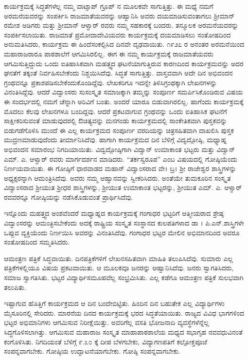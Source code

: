 {ಕಾರ್ಯಕ್ರಮಕ್ಕೆ ಸಿದ್ಧತೆಗಳೆಲ್ಲ ನಮ್ಮ ವಾಟ್ಸಾಪ್ ಗ್ರೂಪ್ ನ ಮೂಲಕವೇ ಸಾಗುತ್ತಿತ್ತು. ಈ ಮಧ್ಯೆ ನಮಗೆ ಅರಮನೆಯವರನ್ನು ಸಂಪರ್ಕಿಸಿ ರಾಜಮಾತೆಯವರನ್ನು ಆಹ್ವಾನಿಸಿ ಅವರು ದಯಮಾಡಿಸುವಂತಾಗಲು ಶ್ರೀಮಾನ್ ರಮೇಶ ಅಡಿಗರು ಮತ್ತು ಶ್ರೀಮಾನ್ ಆಳ್ವಾರ್ ರವರು ನಮ್ಮ ಸಹಕಾರಕ್ಕೆ ಬಂದರು. ತನ್ಮೂಲಕ ಅರಮನೆಯವರನ್ನು ಸಂಪರ್ಕಿಸಲಾಯಿತು. ರಾಜಮಾತೆ ಪ್ರಮೋದಾದೇವಿಯವರು ಕಾರ್ಯಕ್ರಮಕ್ಕೆ ದಯಮಾಡಿಸಲು ಸಂತೋಷದಿಂದ ಅನುಮತಿಸಿದರು, ಕಾರ್ಯಕ್ರಮ ಈ ಹಿಂದೆ\break ಸಂಕಲ್ಪಿಸಿದ ದಿನವೇ ದೃಢವಾಯಿತು. ೧೯೨೭ ರ ಅನಂತರ ಅರಮನೆಯಿಂದ ಮಹಾರಾಜರಾರೂ ಪಾಠಶಾಲೆಗೆ ಆಗಮಿಸಿರಲಿಲ್ಲ. ಈಗ ಈ ನಮ್ಮ ಕಾರ್ಯಕ್ರಮಕ್ಕೆ ರಾಜಮಾತೆಯವರು ಆಗಮಿಸುತ್ತಿದ್ದುದು ಒಂದು ಐತಿಹಾಸಿಕವಾಗಿ ಮಹತ್ತ್ವದ ಘಟನೆ\-ಯಾಗುತ್ತಿರುವ ಕಾರಣದಿಂದ ಕಾರ್ಯಕ್ರಮವನ್ನು ಅದರ ಘನತೆಗೆ ತಕ್ಕಂತೆ ನಿರ್ವಹಿಸಬೇಕೆಂದು ನಿಶ್ಚಯಿಸಿದೆವು. ಸಿದ್ಧತೆ ಸಾಗುತ್ತಿತ್ತು. ವಾಸ್ತವವಾಗಿ ಅದೇ ದಿನ ಅಭಿವಂದನ ಗ್ರಂಥವನ್ನೂ ಪ್ರಕಾಶಪಡಿಸಬೇಕೆಂದುಕೊಂಡಿದ್ದೆವು. ಲೇಖಕರಿಗೂ ಇದನ್ನೇ ತಿಳಿಸಿ\break ಗ್ರಂಥಕ್ಕಾಗಿ ಲೇಖನಗಳನ್ನು ವಿನಂತಿಸಿದ್ದೆವು. ಆದರೆ ವಿದ್ವಾಂಸರು ಸುಸಂಸ್ಕೃತ ಸಮಾಜ\-ಕ್ಕಾಗಿ ತಮ್ಮನ್ನು ಸಂಪೂರ್ಣ ಸಮರ್ಪಿಸಿಕೊಂಡಿರುವ ವಿಷಯ ಈ ಸಂದರ್ಭದಲ್ಲಿ ನಮಗೆ ಚೆನ್ನಾಗಿ ಅರಿವಿಗೆ ಬಂತು. ಅಂದರೆ ಯಾರೂ ಬಿಡುವಾಗಿರಲಿಲ್ಲ. ಹಾಗೆಂದು ಕಾರ್ಯಕ್ರಮಕ್ಕೆ ಮೊದಲು ಕೆಲವು ಲೇಖನಗಳೂ ಬಂದಿದ್ದವು. ಆದರೆ ಪ್ರಕಟವಾಗುವ ಗ್ರಂಥವನ್ನು ಒಂದು ಐತಿಹಾಸಿಕ ಘಟನೆಗೆ ಸಾಕ್ಷೀಕರಿಸುವಂತೆ ಮಾಡುವುದರಲ್ಲಿ  ಔಚಿತ್ಯವನ್ನು ಮನಗಂಡು ಕಾರ್ಯಕ್ರಮದಲ್ಲಿ ಸಾಂಕೇತಿಕವಾಗಿ ಪುಸ್ತಕವನ್ನು ಬಿಡುಗಡೆಗೊಳಿಸಿ ಮುಂದೆ ಈ ಎಲ್ಲ ಕಾರ್ಯಕ್ರಮದ ಸಂಪೂರ್ಣ ವರದಿಯನ್ನು ಚಿತ್ರಸಹಿತವಾಗಿ ದಾಖಲಿಸಿ ಪುಸ್ತಕ ಮುದ್ರಣಮಾಡುವುದೆಂದು ತೀರ್ಮಾನಿಸಿದೆವು. ಹಾಗಾಗಿ ಕಾರ್ಯಕ್ರಮದ ದಿನ ಬೆಳಿಗ್ಗೆ ವಿದ್ವದ್ಗೋಷ್ಠಿ, ಮಧ್ಯಾಹ್ನ ಅಭಿವಂದನ ಸಮಾರಂಭ ನಿಗದಿಯಾಯಿತು. ವಿದ್ವದ್ಗೋಷ್ಠಿಗಾಗಿ ವಿದ್ವಾನ್ ಉಮಾಕಾಂತ ಭಟ್ಟರು ಮತ್ತು ವಿದ್ವಾನ್ ಎಮ್. ಎ. ಆಳ್ವಾರ್ ರವರು ಮಾರ್ಗದರ್ಶನ ಮಾಡಿದರು. “ತರ್ಕಸ್ವರೂಪ” ಎಂಬ ವಿಷಯದಲ್ಲಿ ಗೋಷ್ಠಿಯೆಂದು ನಿರ್ಣಯವಾಯಿತು. ಈ ಗೋಷ್ಠಿಗೆ ಧಾರವಾಡದ ಮಹಾನ್ ವಿದ್ವಾಂಸರಾದ ವೇ। ಬ್ರ। ಶ್ರೀ ರಾಜೇಶ್ವರ ಶಾಸ್ತ್ರಿಗಳನ್ನು ಅಧ್ಯಕ್ಷರನ್ನಾಗಿ ಆಮಂತ್ರಿಸಿದೆವು. ಅವರು ನಮ್ಮ ಆಹ್ವಾನವನ್ನು ಸ್ವೀಕರಿಸಿದರು. ಅಂತೆಯೇ ತುಮಕೂರಿನ ಸಂಸ್ಕೃತ ವಿದ್ವಾಂಸರಾದ ಶ್ರೀಯುತ ಶ್ರೀಧರ ಶಾಸ್ತ್ರಿಗಳನ್ನು,  ಶ್ರೀಯುತ ಉಮಾಕಾಂತ ಭಟ್ಟರನ್ನು, ಶ್ರೀಯುತ ಎಮ್. ಎ. ಆಳ್ವಾರ್ ರವವರನ್ನೂ ಗೋಷ್ಠಿಯನ್ನು ನಡೆಸಿಕೊಡುವಂತೆ ಪ್ರಾರ್ಥಿಸಿದೆವು. 
\vskip 8pt

ಇನ್ನೊಂದು ಮಹತ್ತ್ವದ ಅಂಶವೆಂದರೆ ಮಧ್ಯಾಹ್ನದ ಕಾರ್ಯಕ್ರಮಕ್ಕೆ ಗಂಗಾಧರ ಭಟ್ಟರಿಗೆ ಆತ್ಮೀಯರಾದ ಶ್ರೇಷ್ಠ ವಿದ್ವಾಂಸರನ್ನು ಆಮಂತ್ರಿಸಬೇಕೆಂದು ಅದಕ್ಕೆ ರಾಷ್ಟ್ರಿಯ ಸಂಸ್ಕೃತ ಸಂಸ್ಥಾನದ ಕುಲಪತಿಗಳಾದ ಡಾ । ಪಿ.ಎನ್.ಶಾಸ್ತ್ರಿಗಳೇ ಒಪ್ಪುವ ವ್ಯಕ್ತಿಯೆಂದು ನಿರ್ಣಯಿಸಿ ಅವರನ್ನು ವಿನಂತಿಸಿದೆವು. ಗಂಗಾಧರ ಭಟ್ಟರ ಮೇಲಿನ ಅಭಿಮಾನದಿಂದ ಅವರೂ ಸಂತೋಷದಿಂದ ಸಮ್ಮತಿಸಿದರು. 

ಆಮಂತ್ರಣ ಪತ್ರಿಕೆ ಸಿದ್ಧವಾಯಿತು. ದಿನಪತ್ರಿಕೆಗಳಿಗೆ ಲೇಖನಸಹಿತವಾಗಿ ಮಾಹಿತಿ ತಲುಪಿಸಿದೆವು. ಸುಮಾರು ಎಲ್ಲ ಪತ್ರಿಕೆಗಳಲ್ಲಿಯೂ ವಿಷಯ ಪ್ರಕಟವಾಯಿತು. ಆ ಮೂಲಕವೂ ಜನರನ್ನು ಆಹ್ವಾನಿಸಿದೆವು. ಜನರು ಸ್ವಾಗತಿಸಿದರು, ಸಮಾಜ \hbox{ಸ್ವಾಗತಿಸಿತು}. ಭಟ್ಟರ ವಿದ್ಯಾರ್ಥಿಸಮೂಹವೆಲ್ಲ ಸಂಭ್ರಮಿಸಿತು. ಎಲ್ಲ ಕಡೆಗೂ ಆಮಂತ್ರಣ ಪತ್ರಿಕೆ ಸುಲಭವಾಗಿ ತಲುಪಿತು.  

ಇಷ್ಟಾಗುವ ಹೊತ್ತಿಗೆ ಕಾರ್ಯಕ್ರಮದ ಆ ದಿನ ಬಂದೇಬಿಟ್ಟಿತು. ಹಿಂದಿನ ದಿನ ಬಹುತೇಕ ಎಲ್ಲ ವಿದ್ಯಾರ್ಥಿಗಳು ಮೈಸೂರಿನಲ್ಲಿ ಸೇರಿದರು. ಮಾರನೆಯ ದಿನದ ಕಾರ್ಯಕ್ರಮಕ್ಕೆ ಭರದ ಸಿದ್ಧತೆಯಾಯಿತು. ರಾಜ್ಯದ ವಿವಿಧ ಭಾಗಗಳಿಂದ ಭಟ್ಟರ ಅಭಿಮಾನಿಗಳು ಆಗಮಿಸುವ ನಿರೀಕ್ಷೆಯಿತ್ತು. ಅವರಿಗೆಲ್ಲ ವಸತಿ ಭೋಜನಾದಿ ವ್ಯವಸ್ಥೆ\-ಗಳೆನ್ನೆಲ್ಲ ಸಿದ್ಧಗೊಳಿಸಲಾಗಿತ್ತು. ಆಗಮಿಸುವ ಮಹಾರಾಜ ಸಂಸ್ಕೃತ ಮಾಹಾಪಾಠ\-ಶಾಲೆಯ ಮಧ್ಯದ ಸಭಾಗೃಹ ನವವಧುವಿನಂತೆ ಕಂಗೊಳಿಸಿತು. ನಿಗದಿಯಂತೆ ಬೆಳಿಗ್ಗೆ ೯.೩೦ ಕ್ಕೆ ದೀಪ ಬೆಳಗಬೇಕು, ವಿದ್ಯಾಗಣಪತಿಗೆ ಕಲ್ಪೋಕ್ತಪೂಜೆ ಸಂಪನ್ನವಾಗಬೇಕು. ಗೋಷ್ಠಿಯ ಉದ್ಘಾಟನೆಯಾಗಬೇಕು. ಗೋಷ್ಠಿ ಸಂಪನ್ನವಾಗಬೇಕು.

}
